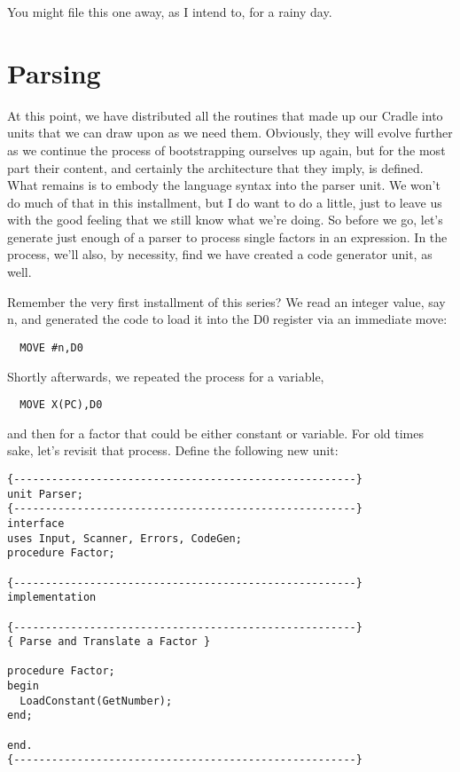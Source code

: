 You might file this one away, as I intend to, for a rainy day.

\section{Parsing}

At this point, we have distributed all the routines that made up our Cradle into units that we can draw upon as we need them. Obviously, they will evolve further as we continue the process of bootstrapping ourselves up again, but for the most part their content, and certainly the architecture that they imply, is defined. What remains is to embody the language syntax into the parser unit. We won't do much of that in this installment, but I do want to do a little, just to leave us with the good feeling that we still know what we're doing. So before we go, let's generate just enough of a parser to process single factors in an expression. In the process, we'll also, by necessity, find we have created a code generator unit, as well.

Remember the very first installment of this series?  We read an integer value, say n, and generated the code to load it into the D0 register via an immediate move:

\begin{verbatim}
  MOVE #n,D0
\end{verbatim}

Shortly afterwards, we repeated the process for a variable,

\begin{verbatim}
  MOVE X(PC),D0
\end{verbatim}

and then for a factor that could be either constant or variable. For old times sake, let's revisit that process. Define the following new unit:

\begin{verbatim}
{------------------------------------------------------}
unit Parser;
{------------------------------------------------------}
interface
uses Input, Scanner, Errors, CodeGen;
procedure Factor;

{------------------------------------------------------}
implementation

{------------------------------------------------------}
{ Parse and Translate a Factor }

procedure Factor;
begin
  LoadConstant(GetNumber);
end;

end.
{------------------------------------------------------}
\end{verbatim}

